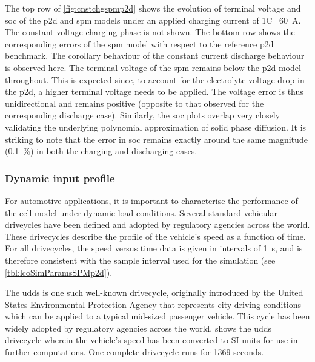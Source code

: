 The top row of \cref{fig:cnstchgspmp2d} shows  the evolution of terminal voltage
and \gls{soc}  of the \gls{p2d} and  \gls{spm} models under an  applied charging
current of  1C \ie~\SI{60}{\ampere}.  The constant-voltage charging  phase is
not shown. The bottom row shows  the corresponding errors of the \gls{spm} model
with respect  to the reference  \gls{p2d} benchmark. The corollary  behaviour of
the constant current discharge behaviour  is observed here. The terminal voltage
of the \gls{spm} remains below the  \gls{p2d} model throughout. This is expected
since, to  account for the electrolyte  voltage drop in the  \gls{p2d}, a higher
terminal voltage needs  to be applied. The voltage error  is thus unidirectional
and remains positive (opposite to  that observed for the corresponding discharge
case).  Similarly,  the \gls{soc}  plots  overlap  very closely  validating  the
underlying polynomial approximation of solid  phase diffusion. It is striking to
note  that the  error in  \gls{soc} remains  exactly around  the same  magnitude
(\approx\SI{0.1}{\percent}) in both the charging and discharging cases.

\subsubsection*{Dynamic input profile}\label{subsubsec:dynamicspmp2dsim}

For automotive applications, it is  important to characterise the performance of
the  cell  model  under  dynamic load  conditions.  Several  standard  vehicular
driveycles  have been  defined and  adopted  by regulatory  agencies across  the
world.  These drivecycles  describe  the profile  of the  vehicle's  speed as  a
function of time.  For all drivecycles, the  speed versus time data  is given in
intervals  of  \SI{1}{\second}, and  is  therefore  consistent with  the  sample
interval used for the simulation (see \cref{tbl:lcoSimParamsSPMp2d}).

The \gls{udds} is  one such well-known drivecycle, originally  introduced by the
United  States  Environmental Protection  Agency  that  represents city  driving
conditions which can  be applied to a typical mid-sized  passenger vehicle. This
cycle  has  been  widely  adopted  by  regulatory  agencies  across  the  world.
  shows  the  \gls{udds} drivecycle  wherein  the
vehicle's speed has been converted to  SI units for use in further computations.
One complete drivecycle runs for 1369 seconds.

